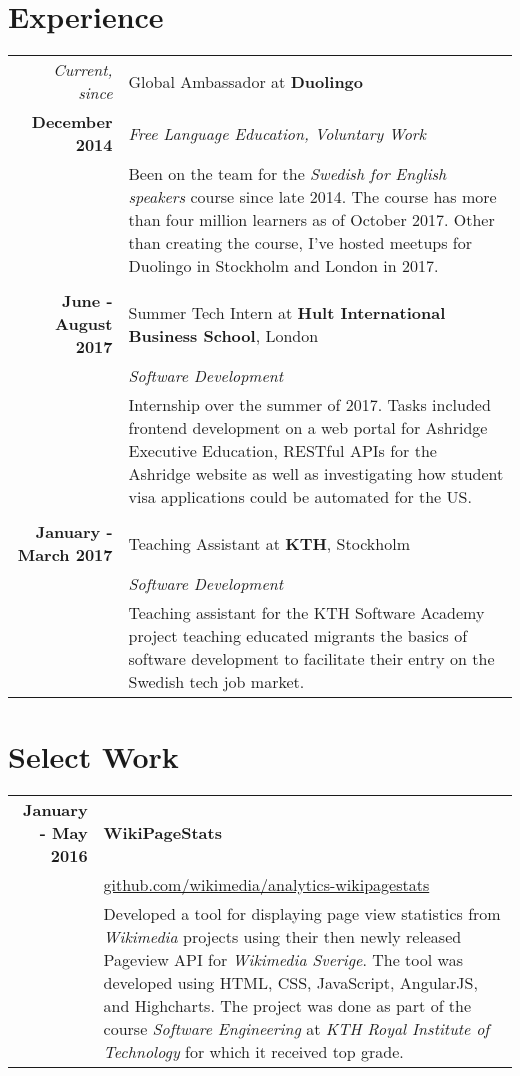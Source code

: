 \documentclass[a4paper,10pt]{article}
\begin{document}
\section{Experience}
\begin{tabular}{r|p{11cm}}
\emph{Current, since} & Global Ambassador at \textbf{Duolingo}\\\textbf{December 2014}&\emph{Free Language Education, Voluntary Work}\\&\footnotesize{Been on the team for the \emph{Swedish for English speakers} course since late 2014. The course has more than four million learners as of October 2017. Other than creating the course, I've hosted meetups for Duolingo in Stockholm and London in 2017.}\\ \\

\textbf{June - August 2017} & Summer Tech Intern at \textbf{Hult International Business School}, London \\
& \emph{Software Development} \\
& \footnotesize{Internship over the summer of 2017. Tasks included frontend development on a web portal for Ashridge Executive Education, RESTful APIs for the Ashridge website as well as investigating how student visa applications could be automated for the US.} \\ \\

\textbf{January - March 2017} & Teaching Assistant at \textbf{KTH}, Stockholm \\
& \emph{Software Development} \\
& \footnotesize{Teaching assistant for the KTH Software Academy project teaching educated migrants the basics of software development to facilitate their entry on the Swedish tech job market.} \\
\end{tabular}

\section{Select Work}
\begin{tabular}{r|p{11cm}}
\textbf{January - May 2016} & \textbf{WikiPageStats} \\
    & \href{https://github.com/wikimedia/analytics-wikipagestats}{github.com/wikimedia/analytics-wikipagestats} \\
    & \footnotesize{Developed a tool for displaying page view statistics from \emph{Wikimedia} projects using their then newly released Pageview API for \emph{Wikimedia Sverige}. The tool was developed using HTML, CSS, JavaScript, AngularJS, and Highcharts. The project was done as part of the course \emph{Software Engineering} at \emph{KTH Royal Institute of Technology} for which it received top grade.}
\end{tabular}
\end{document}
